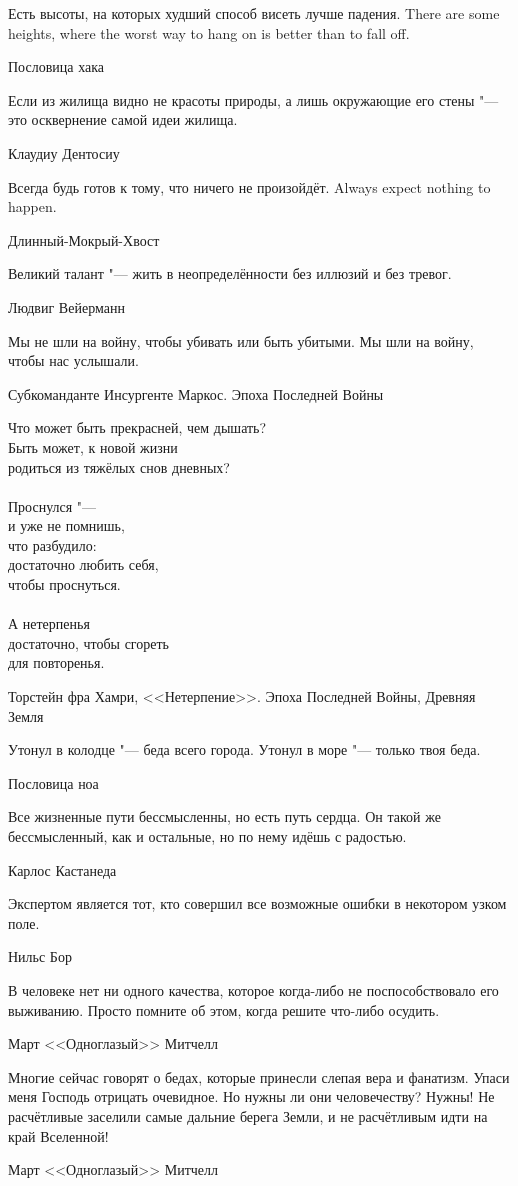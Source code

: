\epigraph{
{Есть высоты, на которых худший способ висеть лучше падения.}
{There are some heights, where the worst way to hang on is better than to fall off.}
}{Пословица хака}

\epigraph
{Если из жилища видно не красоты природы, а лишь окружающие его стены "--- это осквернение самой идеи жилища.}
{Клаудиу Дентосиу}

\epigraph{
{Всегда будь готов к тому, что ничего не произойдёт.}
{Always expect nothing to happen.}
}{Длинный-Мокрый-Хвост}

\epigraph
{Великий талант "--- жить в неопределённости без иллюзий и без тревог.}
{Людвиг Вейерманн}

\epigraph
{Мы не шли на войну, чтобы убивать или быть убитыми.
Мы шли на войну, чтобы нас услышали.}
{Субкоманданте Инсургенте Маркос.
Эпоха Последней Войны}

\epigraph
{Что может быть прекрасней, чем дышать?\\
Быть может, к новой жизни\\
родиться из тяжёлых снов дневных?\\
~\\
Проснулся "---\\
и уже не помнишь,\\
что разбудило:\\
достаточно любить себя,\\
чтобы проснуться.\\
~\\
А нетерпенья\\
достаточно, чтобы сгореть\\
для повторенья.}
{Торстейн фра Хамри, <<Нетерпение>>.
Эпоха Последней Войны, Древняя Земля}

\epigraph
{Утонул в колодце "--- беда всего города.
Утонул в море "--- только твоя беда.}
{Пословица ноа}

\epigraph
{Все жизненные пути бессмысленны, но есть путь сердца.
Он такой же бессмысленный, как и остальные, но по нему идёшь с радостью.}
{Карлос Кастанеда}

\epigraph
{Экспертом является тот, кто совершил все возможные ошибки в некотором узком поле.}
{Нильс Бор}

\epigraph
{В человеке нет ни одного качества, которое когда-либо не поспособствовало его выживанию.
Просто помните об этом, когда решите что-либо осудить.}
{Март <<Одноглазый>> Митчелл}

\epigraph
{Многие сейчас говорят о бедах, которые принесли слепая вера и фанатизм.
Упаси меня Господь отрицать очевидное.
Но нужны ли они человечеству?
Нужны!
Не расчётливые заселили самые дальние берега Земли, и не расчётливым идти на край Вселенной!}
{Март <<Одноглазый>> Митчелл}

